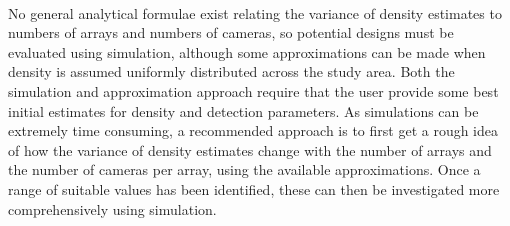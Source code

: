 \documentclass[a4paper,11pt, draft]{article} %
\begin{document}
\\[1em]
No general analytical formulae exist relating the variance of density estimates to numbers of arrays and numbers of cameras, so potential designs must be evaluated using simulation, although some approximations can be made when density is assumed uniformly distributed across the study area. Both the simulation and approximation approach require that the user provide some best initial estimates for density and detection parameters. As simulations can be extremely time consuming, a recommended approach \citep{Efford2019} is to first get a rough idea of how the variance of density estimates change with the number of arrays and the number of cameras per array, using the available approximations. Once a range of suitable values has been identified, these can then be investigated more comprehensively using simulation. 
\end{document}
